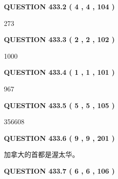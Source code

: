 \documentclass{ctexart}
\begin{document}
{\textbf{\Large{QUESTION
433.2 
 ( 4 , 4 , 104 )
}}}
  
  
 
 
\noindent{}

273
 
 
  
\vspace{0.2in}
  
{\textbf{\Large{QUESTION
433.3 
 ( 2 , 2 , 102 )
}}}
  
  
 
 
\noindent{}

1000
 
 
  
\vspace{0.2in}
  
{\textbf{\Large{QUESTION
433.4 
 ( 1 , 1 , 101 )
}}}
  
  
 
 
\noindent{}

967
 
 
  
\vspace{0.2in}
  
{\textbf{\Large{QUESTION
433.5 
 ( 5 , 5 , 105 )
}}}
  
  
 
 
\noindent{}

356608
 
 
  
\vspace{0.2in}
  
{\textbf{\Large{QUESTION
433.6 
 ( 9 , 9 , 201 )
}}}
  
  
 
 
\noindent{}
 
 
加拿大的首都是渥太华。
 
 
 
 
  
\vspace{0.2in}
  
{\textbf{\Large{QUESTION
433.7 
 ( 6 , 6 , 106 )
}}}
  
  
 
 
\noindent{}
\end{document}
